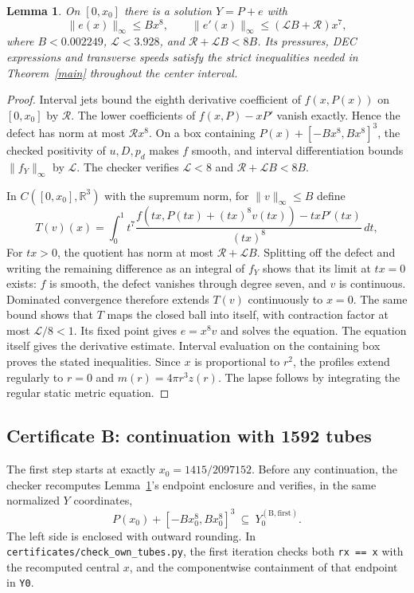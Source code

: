 \documentclass[11pt]{article}
\newtheorem{lemma}{Lemma}
\begin{document}
\begin{lemma}\label{center}
On $[0,x_0]$ there is a solution $Y=P+e$ with
\[
 \|e(x)\|_\infty\leq Bx^8,\qquad
 \|e'(x)\|_\infty\leq(\mathcal L B+\mathcal R)x^7,
\]
where $B<0.002249$, $\mathcal L<3.928$, and
$\mathcal R+\mathcal L B<8B$. Its pressures, DEC expressions and transverse speeds satisfy the strict inequalities needed in Theorem~\ref{main} throughout the center interval.
\end{lemma}
\begin{proof}
Interval jets bound the eighth derivative coefficient of $f(x,P(x))$ on $[0,x_0]$ by $\mathcal R$. The lower coefficients of $f(x,P)-xP'$ vanish exactly. Hence the defect has norm at most $\mathcal R x^8$. On a box containing $P(x)+[-Bx^8,Bx^8]^3$, the checked positivity of $u,D,p_d$ makes $f$ smooth, and interval differentiation bounds $\|f_Y\|_\infty$ by $\mathcal L$. The checker verifies $\mathcal L<8$ and $\mathcal R+\mathcal L B<8B$.

In $C([0,x_0],\mathbb R^3)$ with the supremum norm, for $\|v\|_\infty\leq B$ define
\[
 T(v)(x)=\int_0^1 t^7
 \frac{f(tx,P(tx)+(tx)^8v(tx))-txP'(tx)}{(tx)^8}\,dt,
\]
For $tx>0$, the quotient has norm at most $\mathcal R+\mathcal L B$. Splitting off the defect and writing the remaining difference as an integral of $f_Y$ shows that its limit at $tx=0$ exists: $f$ is smooth, the defect vanishes through degree seven, and $v$ is continuous. Dominated convergence therefore extends $T(v)$ continuously to $x=0$. The same bound shows that $T$ maps the closed ball into itself, with contraction factor at most $\mathcal L/8<1$. Its fixed point gives $e=x^8v$ and solves the equation. The equation itself gives the derivative estimate. Interval evaluation on the containing box proves the stated inequalities. Since $x$ is proportional to $r^2$, the profiles extend regularly to $r=0$ and $m(r)=4\pi r^3z(r)$. The lapse follows by integrating the regular static metric equation.
\end{proof}

\subsection{Certificate B: continuation with 1592 tubes}
The first step starts at exactly $x_0=1415/2097152$. Before any
continuation, the checker recomputes Lemma~\ref{center}'s endpoint
enclosure and verifies, in the same normalized $Y$ coordinates,
\begin{equation}\label{connectionB}
 P(x_0)+[-Bx_0^8,Bx_0^8]^3
 \ \subseteq\ Y_0^{(\mathrm B,\mathrm{first})}.
\end{equation}
The left side is enclosed with outward rounding. In
\texttt{certificates/check\_own\_tubes.py}, the first iteration
checks both \texttt{rx == x} with the recomputed central $x$, and
the componentwise containment of that endpoint in \texttt{Y0}.
\end{document}
